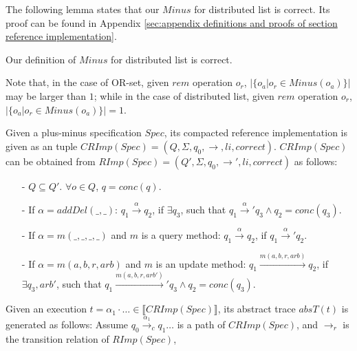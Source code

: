 The following lemma states that our $Minus$ for distributed list is correct. Its proof can be found in Appendix \ref{sec:appendix definitions and proofs of section reference implementation}.

\begin{lemma}
\label{lemma:Minus for distributed list is correct}
Our definition of $Minus$ for distributed list is correct.
\end{lemma}

Note that, in the case of OR-set, given $rem$ operation $o_r$, $\vert \{ o_a \vert o_r \in Minus(o_a) \} \vert$ may be larger than $1$; while in the case of distributed list, given $rem$ operation $o_r$, $\vert \{ o_a \vert o_r \in Minus(o_a) \} \vert = 1$.

Given a plus-minus specification $Spec$, its compacted reference implementation is given as an tuple $CRImp(Spec) = (Q,\Sigma,q_0,\rightarrow,li,correct)$. $CRImp(Spec)$ can be obtained from $RImp(Spec) = (Q',\Sigma,q_0,\rightarrow',li,correct)$ as follows:

\begin{itemize}
\setlength{\itemsep}{0.5pt}
\item[-] $Q \subseteq Q'$. $\forall o \in Q$, $q = conc(q)$.

\item[-] If $\alpha = addDel(\_,\_)$: $q_1 {\xrightarrow{\alpha}} q_2$, if $\exists q_3$, such that $q_1 {\xrightarrow{\alpha}}' q_3 \wedge q_2 = conc(q_3)$.

\item[-] If $\alpha=m(\_,\_,\_,\_)$ and $m$ is a query method: $q_1 {\xrightarrow{\alpha}} q_2$, if $q_1 {\xrightarrow{\alpha}}' q_2$.

\item[-] If $\alpha=m(a,b,r,arb)$ and $m$ is an update method: $q_1 {\xrightarrow{m(a,b,r,arb)}} q_2$, if $\exists q_3,arb'$, such that $q_1 {\xrightarrow{m(a,b,r,arb')}}' q_3 \wedge q_2 = conc(q_3)$.
\end{itemize} 

Given an execution $t = \alpha_1 \cdot \ldots \in \llbracket CRImp(Spec) \rrbracket$, its abstract trace $absT(t)$ is generated as follows: Assume $q_0 {\xrightarrow{\alpha_1}}_c q_1 \ldots$ is a path of $CRImp(Spec)$, and $\rightarrow_r$ is the transition relation of $RImp(Spec)$, 

